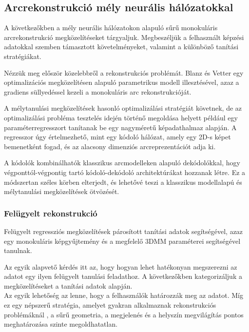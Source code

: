 \documentclass[12pt,a4]{article}
\begin{document}
	\subsection{Arcrekonstrukció mély neurális hálózatokkal}
	
	 A következőkben a mély neurális hálózatokon alapuló sűrű monokuláris arcrekonstrukció megközelítéseket tárgyaljuk. Megbeszéljük
	a felhasznált képzési adatokkal szemben támasztott követelményeket, valamint a különböző tanítási
	stratégiákat. 
	
	
	Nézzük meg először közelebbről a rekonstrukciós problémát. \cite{blanzvetter}Blanz és Vetter egy optimalizációs megközelítésen alapuló parametrikus modell illesztésével, azaz a gradiens süllyedéssel kezeli a monokuláris arc rekonstrukcióját. 
	
	 A mélytanulási megközelítések hasonló optimalizálási stratégiát követnek, de az optimalizálási probléma 
	tesztelés idején történő megoldása helyett például egy paraméterregresszort tanítanak be egy nagyméretű képadathalmaz alapján. A regresszor úgy értelmezhető, mint egy kódoló hálózat, amely egy 2D-s képet
	bemenetként fogad, és az alacsony dimenziós arcreprezentációt adja ki. 
	
	A
	kódolók kombinálhatók klasszikus arcmodelleken alapuló dekódolókkal,
	hogy végponttól-végpontig tartó kódoló-dekódoló architektúrákat hozzanak létre.
	Ez a módszertan széles körben elterjedt, és lehetővé teszi a klasszikus
	modellalapú és mélytanulási megközelítések ötvözését.
	
	\subsubsection{Felügyelt rekonstrukció}
	Felügyelt regressziós megközelítések
	párosított tanítási adatok segítségével, azaz egy monokuláris  képgyűjtemény
	és a megfelelő 3DMM paraméterei segítségével tanulnak.
	
	Az egyik alapvető kérdés itt az, hogy hogyan lehet hatékonyan megszerezni az adatot egy ilyen felügyelt tanulási feladathoz. A következőkben
	kategorizáljuk a megközelítéseket a
	tanítási adatok alapján. \\
	
	Az egyik lehetőség az lenne, hogy a felhasználók határozzák meg az adatot. Míg ez egy népszerű stratégia, amelyet gyakran alkalmaznak rekonstrukciós problémáknál \cite{saragih}, 
	a sűrű geometria, a megjelenés és a helyszín megvilágítás pontos meghatározása szinte megoldhatatlan.
	
\end{document}
